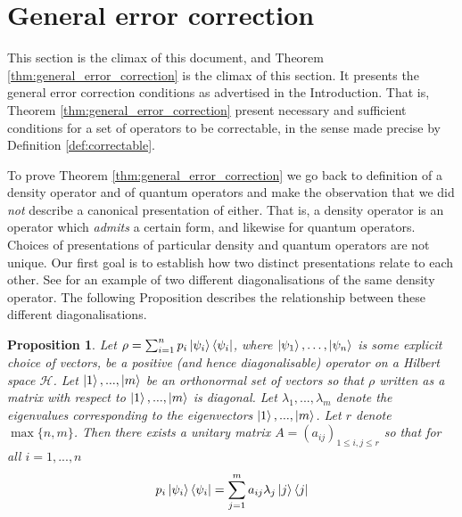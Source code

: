 \documentclass[12pt]{article}
\theoremstyle{plain}
\newtheorem{proposition}[thm]{Proposition}
\theoremstyle{definition}
\newcommand{\call}[1]{\mathcal{#1}}
\begin{document}
	\section{General error correction}
	This section is the climax of this document, and Theorem \ref{thm:general_error_correction} is the climax of this section. It presents the general error correction conditions as advertised in the Introduction. That is, Theorem \ref{thm:general_error_correction} present necessary and sufficient conditions for a set of operators to be correctable, in the sense made precise by Definition \ref{def:correctable}.
	
	To prove Theorem \ref{thm:general_error_correction} we go back to definition of a density operator and of quantum operators and make the observation that we did \emph{not} describe a canonical presentation of either. That is, a density operator is an operator which \emph{admits} a certain form, and likewise for quantum operators. Choices of presentations of particular density and quantum operators are not unique. Our first goal is to establish how two distinct presentations relate to each other. See \cite[Page 103]{quantum_computing} for an example of two different diagonalisations of the same density operator. The following Proposition describes the relationship between these different diagonalisations.
	\begin{proposition}\label{prop:equivalent_density_operators}
		Let $\rho = \sum_{i = 1}^n p_i \ket{\psi_i}\bra{\psi_i}$, where $\ket{\psi_1},\ldots, \ket{\psi_n}$ is some explicit choice of vectors, be a positive (and hence diagonalisable) operator on a Hilbert space $\call{H}$. Let $\ket{1},...,\ket{m}$ be an orthonormal set of vectors so that $\rho$ written as a matrix with respect to $\ket{1},...,\ket{m}$ is diagonal. Let $\lambda_1,...,\lambda_m$ denote the eigenvalues corresponding to the eigenvectors $\ket{1},...,\ket{m}$. Let $r$ denote $\operatorname{max}\lbrace n, m \rbrace$. Then there exists a unitary matrix $A = (a_{ij})_{1 \leq i,j \leq r}$ so that for all $i = 1,...,n$
		\begin{equation}
			p_i\ket{\psi_i}\bra{\psi_i} = \sum_{j = 1}^m a_{ij} \lambda_j\ket{j}\bra{j}
		\end{equation}
	\end{proposition}
\end{document}
